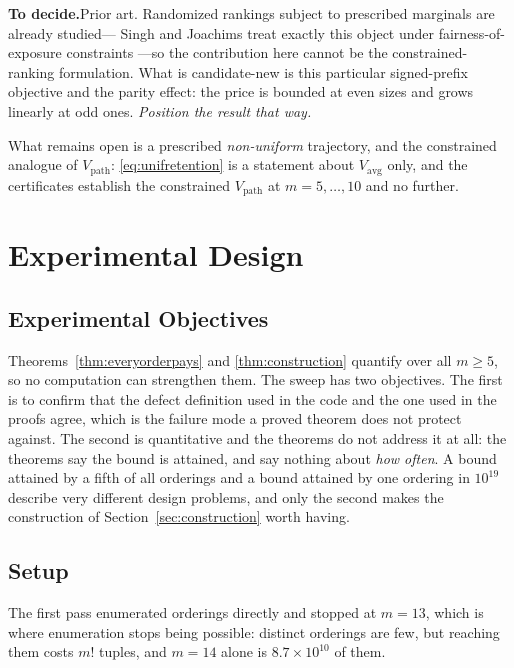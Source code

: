 \documentclass[conference]{IEEEtran}
\theoremstyle{definition}
\newif\ifshownotes\shownotestrue
\newcommand{\TODOPAR}[1]{\ifshownotes\par\vspace{2pt}\noindent%
  {\color{todocol}\textsf{\footnotesize\textbf{To decide.}\;#1}}\par\vspace{2pt}\fi}
\begin{document}
\TODOPAR{Prior art. Randomized rankings subject to prescribed marginals are already studied---
Singh and Joachims treat exactly this object under fairness-of-exposure constraints
\cite{singh2018}---so the contribution here cannot be the constrained-ranking formulation. What
is candidate-new is this particular signed-prefix objective and the parity effect: the price is
bounded at even sizes and grows linearly at odd ones. \emph{Position the result that way.}}

What remains open is a prescribed \emph{non-uniform} trajectory, and the constrained analogue
of $V_{\mathrm{path}}$: \eqref{eq:unifretention} is a statement about $V_{\mathrm{avg}}$ only,
and the certificates establish the constrained $V_{\mathrm{path}}$ at $m=5,\dots,10$ and no
further.

\section{Experimental Design}
\label{sec:expdesign}

\subsection{Experimental Objectives}

Theorems~\ref{thm:everyorderpays} and \ref{thm:construction} quantify over all $m\ge5$, so no
computation can strengthen them. The sweep has two objectives. The first is to confirm that
the defect definition used in the code and the one used in the proofs agree, which is the
failure mode a proved theorem does not protect against. The second is quantitative and the
theorems do not address it at all: the theorems say the bound is attained, and say nothing
about \emph{how often}. A bound attained by a fifth of all orderings and a bound attained by
one ordering in $10^{19}$ describe very different design problems, and only the second makes
the construction of Section~\ref{sec:construction} worth having.

\subsection{Setup}

The first pass enumerated orderings directly and stopped at $m=13$, which is where
enumeration stops being possible: distinct orderings are few, but reaching them costs $m!$
tuples, and $m=14$ alone is $8.7\times10^{10}$ of them.
\end{document}
